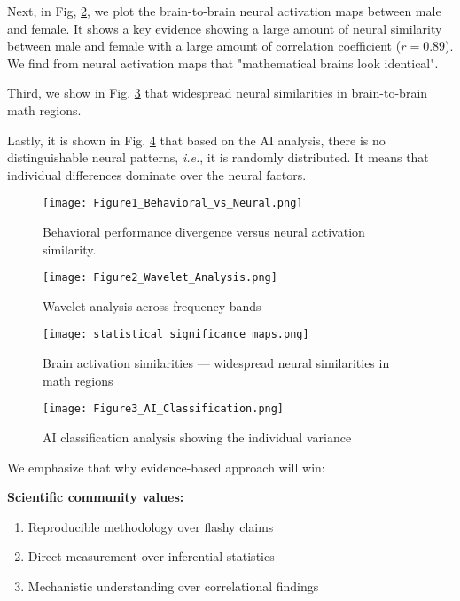 \documentclass[pdflatex,reference]{sn-jnl}%
\theoremstyle{thmstyleone}%
\theoremstyle{thmstyletwo}%
\theoremstyle{thmstylethree}%
\begin{document}
Next, in Fig, \ref{fig:2}, we plot the brain-to-brain neural activation maps between male and female. It shows a key evidence showing a large amount of neural similarity between male and female with a large amount of correlation coefficient ($r = 0.89$). We find from neural activation maps that "mathematical brains look identical".

Third, we show in Fig. \ref{fig:3} that widespread neural similarities in brain-to-brain math regions. 

Lastly, it is shown in Fig. \ref{fig:4} that based on the AI analysis, there is no distinguishable neural patterns, {\it i.e.}, it is randomly distributed. It means that individual differences dominate over the neural factors.

\begin{figure}[htbp]
\centering
\texttt{[image: Figure1\_Behavioral\_vs\_Neural.png]}
\caption{Behavioral performance divergence versus neural activation similarity.}
\label{fig:1}
\end{figure}

\begin{figure}[htbp]
\texttt{[image: Figure2\_Wavelet\_Analysis.png]}
\caption{Wavelet analysis across frequency bands}
\label{fig:2}
\end{figure}

\begin{figure}[htbp]
\centering
\texttt{[image: statistical\_significance\_maps.png]}
\caption{Brain activation similarities --- widespread neural similarities in math regions}
\label{fig:3}
\end{figure}

\begin{figure}[htbp]
\texttt{[image: Figure3\_AI\_Classification.png]}
\caption{AI classification analysis showing the individual variance}
\label{fig:4}
\end{figure}



\medskip\noindent
We emphasize that why evidence-based approach will win:

\medskip\noindent
\textbf{Scientific community values:}
\begin{enumerate}
\item Reproducible methodology over flashy claims
\item Direct measurement over inferential statistics
\item Mechanistic understanding over correlational findings
\end{enumerate}
\end{document}
